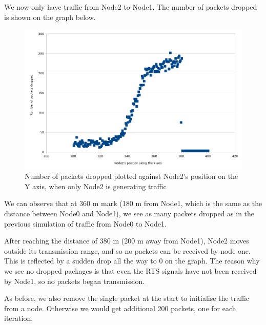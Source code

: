 \documentclass[11pt,journal]{article}
\begin{document}
	\section{}
	We now only have traffic from Node2 to Node1. The number of packets dropped is shown on the graph below.
	\begin{figure}[h]
		\centering
		\includegraphics[scale=0.6]{graph3.png}
		\caption{Number of packets dropped plotted against Node2's position on the Y axis, when only Node2 is generating traffic}
	\end{figure}
	
	We can observe that at 360 m mark (180 m from Node1, which is the same as the distance between Node0 and Node1), we see as many packets dropped as in the previous simulation of traffic from Node0 to Node1.
	
	After reaching the distance of 380 m (200 m away from Node1), Node2 moves outside its transmission range, and so no packets can be received by node one. This is reflected by a sudden drop all the way to 0 on the graph. The reason why we see no dropped packages is that even the RTS signals have not been received by Node1, so no packets began transmission.

	As before, we also remove the single packet at the start to initialise the traffic from a node. Otherwise we would get additional 200 packets, one for each iteration.

	\pagebreak	
	
	\begin{thebibliography}{1}

		
	\end{thebibliography}
	
	
	

	
\end{document}

